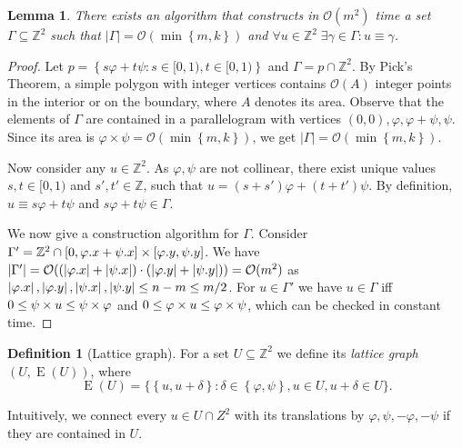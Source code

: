 \documentclass[11pt, letterpaper]{article}
\theoremstyle{plain}
\newtheorem{lemma}{Lemma}
\theoremstyle{definition}
\newtheorem{definition}{Definition}
\theoremstyle{remark}
\newcommand{\Z}{\mathbb{Z}}
\renewcommand{\O}{\mathcal{O}}
\renewcommand{\phi}{\varphi}
\newcommand{\set}[1]{\left\lbrace #1 \right\rbrace}
\newcommand{\bigset}[1]{\big \lbrace #1 \big \rbrace}
\DeclareMathOperator*{\Edges}{E}
\newcommand{\absolute}[1]{\left\lvert#1\right\rvert}
\begin{document}
\begin{lemma} \label{lattice_base}
	There exists an algorithm that constructs in $\O(m^2)$ time a set $\Gamma \subseteq \Z^2$ such that $\absolute{\Gamma} = \O(\min\set{m, k})$ and $\forall u \in \Z^2 \; \exists \gamma \in \Gamma : u \equiv \gamma$.
\end{lemma} 
	\begin{proof}
		Let $p = \set{s\phi + t\psi : s \in [0, 1), t \in [0, 1)}$ and $\Gamma = p \cap \Z^2$.
		By Pick's Theorem, a simple polygon with integer vertices contains $\O(A)$ integer points in the interior or on the boundary, where $A$ denotes its area.
		Observe that the elements of $\Gamma$ are contained in a parallelogram with vertices $(0, 0), \phi, \phi + \psi, \psi$.
		Since its area is $\phi \times \psi = \O(\min\set{m, k})$, we get $\absolute{\Gamma} = \O(\min\set{m, k})$.
		
		Now consider any $u \in \Z^2$.
		As $\phi, \psi$ are not collinear, there exist unique values $s, t \in [0, 1)$ and $s', t' \in \Z$, such that
		$u = (s + s') \phi + (t + t') \psi$.
		By definition, 
		$u \equiv s\phi + t\psi$ and $s\phi + t\psi \in \Gamma$.
		
		We now give a construction algorithm for $\Gamma$. Consider $\Gamma' = \Z^2 \cap [0,\x{\phi}+\x{\psi}] \times [\y{\phi},\y{\psi}]$. We have $\absolute{\Gamma'} = \O((\absolute{\x{\phi}}+\absolute{\x{\psi}}) \cdot (\absolute{\y{\phi}}+\absolute{\y{\psi}})) = \O(m^2)$ as $\absolute{\x{\phi}}, \absolute{\y{\phi}}, \absolute{\x{\psi}}, \absolute{\y{\psi}} \le n - m \le m / 2$. For $u \in \Gamma'$ we have $u \in \Gamma$ iff $0 \le \s{u} \le \s{\phi}$ and $0 \le \h{u} \le \h{\psi}$, which can be checked in constant time. 
	\end{proof}

\begin{definition}[Lattice graph]
	For a set $U \subseteq \Z^2$ we define its \emph{lattice graph} $(U, \Edges(U))$, where
$$\Edges(U) = \bigset{\set{u, u + \delta} : \delta \in \set{\phi, \psi}, u \in U, u + \delta \in U}.$$
\end{definition}
Intuitively, we connect every $u \in U \cap Z^2$ with its translations by $\phi, \psi, -\phi, -\psi$ if they are contained in $U$.
\end{document}
